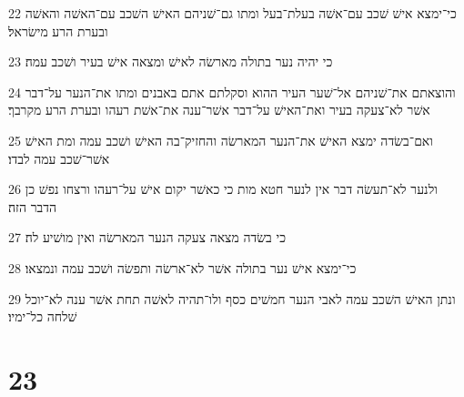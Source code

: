 \par 22 כי־ימצא אישׁ שׁכב עם־אשׁה בעלת־בעל ומתו גם־שׁניהם האישׁ השׁכב עם־האשׁה והאשׁה ובערת הרע מישׂראל׃
\par 23 כי יהיה נער בתולה מארשׂה לאישׁ ומצאה אישׁ בעיר ושׁכב עמה׃
\par 24 והוצאתם את־שׁניהם אל־שׁער העיר ההוא וסקלתם אתם באבנים ומתו את־הנער על־דבר אשׁר לא־צעקה בעיר ואת־האישׁ על־דבר אשׁר־ענה את־אשׁת רעהו ובערת הרע מקרבך׃
\par 25 ואם־בשׂדה ימצא האישׁ את־הנער המארשׂה והחזיק־בה האישׁ ושׁכב עמה ומת האישׁ אשׁר־שׁכב עמה לבדו׃
\par 26 ולנער לא־תעשׂה דבר אין לנער חטא מות כי כאשׁר יקום אישׁ על־רעהו ורצחו נפשׁ כן הדבר הזה׃
\par 27 כי בשׂדה מצאה צעקה הנער המארשׂה ואין מושׁיע לה׃
\par 28 כי־ימצא אישׁ נער בתולה אשׁר לא־ארשׂה ותפשׂה ושׁכב עמה ונמצאו׃
\par 29 ונתן האישׁ השׁכב עמה לאבי הנער חמשׁים כסף ולו־תהיה לאשׁה תחת אשׁר ענה לא־יוכל שׁלחה כל־ימיו׃

\chapter{23}

